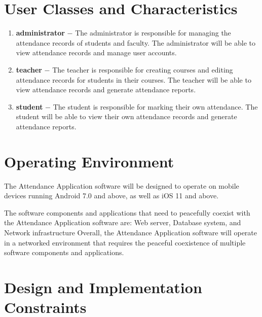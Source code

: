 \documentclass{scrreprt}
\begin{document}
\section{User Classes and Characteristics}
\begin{enumerate}
    \item \textbf{administrator} $-$ The administrator is responsible for managing the attendance records of students and faculty. The administrator will be able to view attendance records and manage user accounts.
    \item \textbf{teacher} $-$ The teacher is responsible for creating courses and editing attendance records for students in their courses. The teacher will be able to view attendance records and generate attendance reports.
    \item \textbf{student} $-$ The student is responsible for marking their own attendance. The student will be able to view their own attendance records and generate attendance reports. 
\end{enumerate}

\section{Operating Environment}
The Attendance Application software will be designed to operate on mobile devices running Android 7.0 and above, as well as iOS 11 and above.

The software components and applications that need to peacefully coexist with the Attendance Application software are: Web server, Database system, and Network infrastructure
Overall, the Attendance Application software will operate in a networked environment that requires the peaceful coexistence of multiple software components and applications.


\section{Design and Implementation Constraints}
\end{document}
